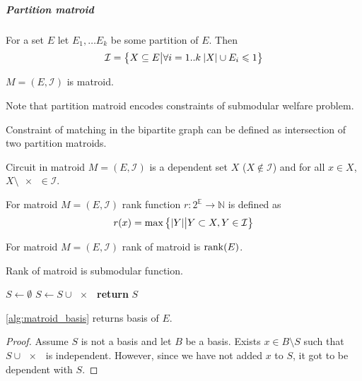 \subparagraph{Partition matroid}
For a set $E$ let $E_1,\dots E_k$ be some partition of $E$. Then
\begin{align}
\mathcal{I}= \qty\big{ X\subseteq E \big\vert \forall i=1..k \: \abs{X}\cup E_i  \leqslant 1  }
\end{align}
\begin{prop}
	$M=(E,\mathcal{I})$ is matroid.
\end{prop}
Note that partition matroid encodes constraints of submodular welfare problem.

Constraint of matching in the bipartite graph can be defined as intersection of two partition matroids.

\begin{definition}[Circuit]
	Circuit in matroid $M=(E,\mathcal{I})$ is a dependent set $X$ ($X\notin \mathcal{I}$) and for all $x\in X$, $X\setminus \qty{x} \in \mathcal{I}$.
\end{definition}
\begin{definition}
For matroid $M=(E,\mathcal{I})$ rank function $r: 2^{\mathbb{E}} \to \mathbb{N}$ is defined as
\begin{align}
r(x) = \max \qty\big{\abs{Y} \big| Y\subset{X}, Y\in \mathcal{I}}
\end{align}
\end{definition}
\begin{definition}
For matroid $M=(E,\mathcal{I})$ rank of matroid is $\rank(E)$.
\end{definition}
\begin{prop}
	Rank of matroid is submodular function.
\end{prop}


\begin{algorithm}
	\caption{}\label{alg:matroid_basis}
	\begin{algorithmic}[1]
		\State $S \gets \emptyset$
		\State $S\gets S\cup \qty{x}$
		\EndIf
		\EndFor
		\State \textbf{return} $S$
		\EndProcedure
	\end{algorithmic}
\end{algorithm}

\begin{prop}
	\vref{alg:matroid_basis} returns basis of $E$.
	\begin{proof}
		Assume $S$ is not a basis and let $B$ be a basis. Exists $x\in B\setminus S$ such that $S\cup \qty{x}$ is independent. However, since we have not added $x$ to $S$, it got to be dependent with $S$.
	\end{proof}
\end{prop}


